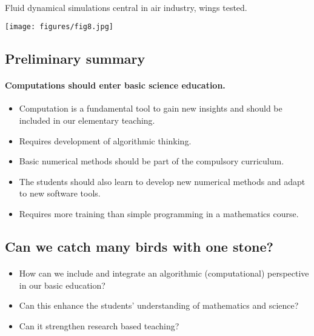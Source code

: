 \documentclass[%
twoside,                 %
final,                   %
10pt]{article}
\begin{document}
\paragraph{}
Fluid dynamical simulations central in air industry, wings tested.


\centerline{\texttt{[image: figures/fig8.jpg]}}



\subsection*{Preliminary summary}

\paragraph{Computations should enter basic science education.}

\begin{itemize}
\item Computation is a fundamental tool to gain new insights and should be included in our elementary teaching.

\item Requires development of algorithmic thinking.

\item Basic numerical methods should be part of the compulsory curriculum.

\item The students should also learn to develop new numerical methods and adapt to new software tools.

\item Requires more training than simple programming in a mathematics course.
\end{itemize}

\noindent




\subsection*{Can we catch many birds with one stone?}

\paragraph{}
\begin{itemize}
\item How can we include and integrate an algorithmic (computational) perspective   in our basic education?

\item Can this enhance the students' understanding of mathematics and science?

\item Can it strengthen research based teaching?
\end{itemize}
\end{document}
